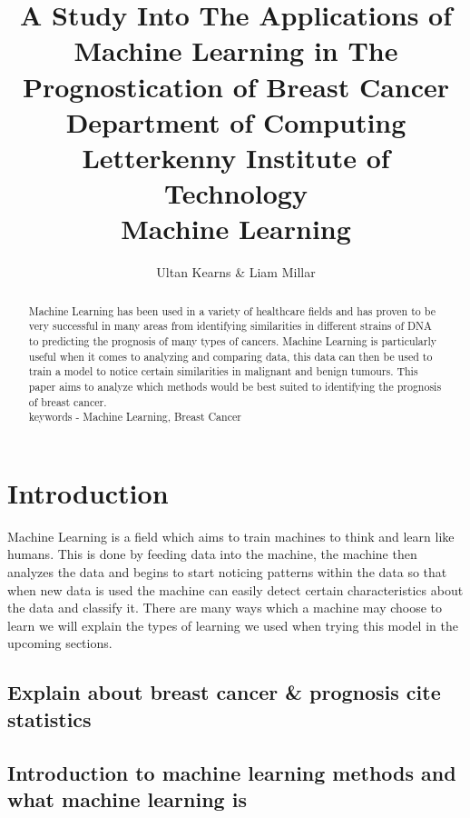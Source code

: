 \documentclass[conference]{IEEEtran}
\begin{document}
\title{
A Study Into The Applications of Machine Learning in The Prognostication of Breast Cancer\\
\vspace{5mm}
\large Department of Computing \\
\vspace{3mm} 
\large Letterkenny Institute of Technology \\
\vspace{3mm} 
\large Machine Learning
}
\vspace{3mm}  
\author{Ultan Kearns \& Liam Millar}
\maketitle
\begin{abstract}
    Machine Learning has been used in a variety of healthcare fields and has proven to be very successful in many areas from identifying similarities in different strains of DNA to predicting the prognosis of many types of cancers.  Machine Learning is particularly useful when it comes to analyzing and comparing data, this data can then be used to train a model to notice certain similarities in malignant and benign tumours.  This paper aims to analyze which methods would be best suited to identifying the prognosis of breast cancer.\\
    keywords - Machine Learning, Breast Cancer
\end{abstract}

\section{Introduction}
Machine Learning is a field which aims to train machines to think and learn like humans.  This is done by feeding data into the machine, the machine then analyzes the data and begins to start noticing patterns within the data so that when new data is used the machine can easily detect certain characteristics about the data and classify it.  There are many ways which a machine may choose to learn we will explain the types of learning we used when trying this model in the upcoming sections.  
\subsection{Explain about breast cancer \& prognosis cite statistics}
\subsection{Introduction to machine learning methods and what machine learning is}
\end{document}
